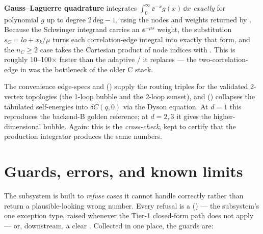 \begin{note}
\textbf{Gauss--Laguerre quadrature} integrates $\int_0^{\infty}\ee^{-x}g(x)\,\dd x$
\emph{exactly} for polynomial $g$ up to degree $2\,\text{deg}-1$, using the nodes
and weights returned by . Because the
Schwinger integrand carries an $\ee^{-\mu s}$ weight, the substitution
$s_C = lo + x_k/\mu$ turns each correlation-edge integral into exactly that form,
and the $n_C\ge 2$ case takes the Cartesian product of node indices with
. This is roughly 10--100$\times$ faster than the
adaptive / it replaces --- the two-correlation-edge
 in  was the bottleneck of
the older C stack.
\end{note}

The convenience edge-specs  and 
() supply the routing triples for the
validated 2-vertex topologies (the 1-loop bubble and the 2-loop sunset), and
 ()
collapses the tabulated self-energies into $\delta C(q,0)$ via the \msrjd{}
Dyson equation. At $d=1$ this reproduces the backend-B golden reference; at
$d=2,3$ it gives the higher-dimensional bubble. Again: this is the
\emph{cross-check}, kept to certify that the production integrator produces the
same numbers.

\section{Guards, errors, and known limits}\label{sec:hk-guards}

The subsystem is built to \emph{refuse} cases it cannot handle correctly rather
than return a plausible-looking wrong number. Every refusal is a
 () --- the subsystem's one
exception type, raised whenever the Tier-1 closed-form path does not apply ---
or, downstream, a clear . Collected in one place, the
guards are:

